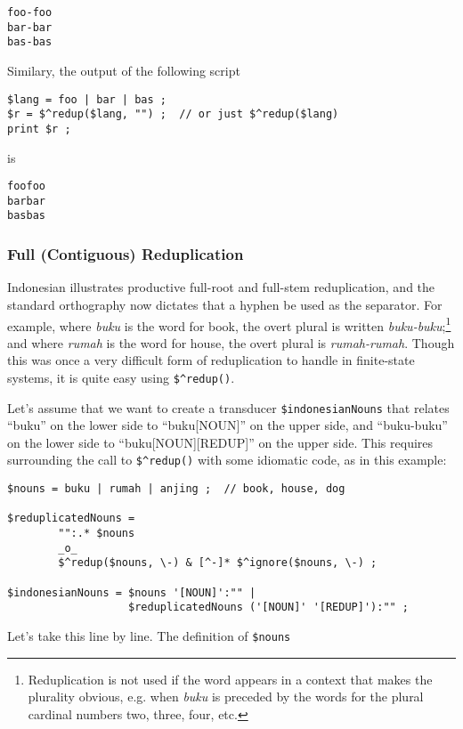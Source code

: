 \begin{Verbatim}
foo-foo
bar-bar
bas-bas
\end{Verbatim}

Similary, the output of the following script

\begin{Verbatim}
$lang = foo | bar | bas ;
$r = $^redup($lang, "") ;  // or just $^redup($lang)
print $r ;
\end{Verbatim}

\noindent
is

\begin{Verbatim}
foofoo
barbar
basbas
\end{Verbatim}


\subsubsection{Full (Contiguous) Reduplication}

Indonesian illustrates productive full-root and full-stem reduplication, and the standard
orthography now dictates that a hyphen be used as the separator.  For example, where \emph{buku} is the
word for book, the overt plural is written \emph{buku-buku};\footnote{Reduplication is not used if
the word appears in a context that makes the plurality obvious, e.g. when \emph{buku} is preceded by
the words for the plural cardinal numbers two, three, four, etc.} and where \emph{rumah} is the word for house,
the overt plural is \emph{rumah-rumah}.  Though this was once a very difficult
form of reduplication to handle in finite-state systems, it is quite easy using \verb!$^redup()!.


Let's assume that we want to create a transducer \verb!$indonesianNouns! that relates ``buku'' on the lower
side to ``buku[NOUN]'' on the upper side, and ``buku-buku'' on the lower side to ``buku[NOUN][REDUP]'' on
the upper side.  This requires surrounding the call to \verb!$^redup()!
with some idiomatic code, as in this example:

\begin{Verbatim}
$nouns = buku | rumah | anjing ;  // book, house, dog

$reduplicatedNouns = 
        "":.* $nouns 
        _o_
        $^redup($nouns, \-) & [^-]* $^ignore($nouns, \-) ;

$indonesianNouns = $nouns '[NOUN]':"" |
                   $reduplicatedNouns ('[NOUN]' '[REDUP]'):"" ;
\end{Verbatim}

\noindent
Let's take this line by line.  The definition of \verb!$nouns!

